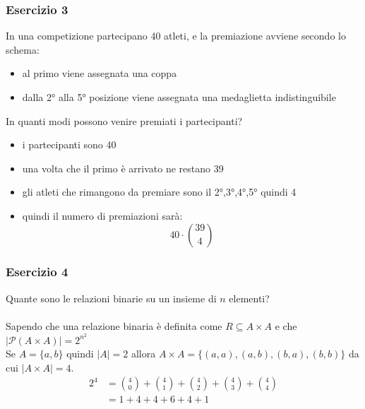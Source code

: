\documentclass[italian]{article}
\begin{document}
\subsubsection{Esercizio 3}
In una competizione partecipano 40 atleti, e la premiazione avviene secondo lo schema:
\begin{itemize}
	\item al primo viene assegnata una coppa
	\item dalla 2° alla 5° posizione viene assegnata una medaglietta indistinguibile
\end{itemize}
In quanti modi possono venire premiati i partecipanti?
\begin{itemize}
	\item i partecipanti sono 40
	\item una volta che il primo è arrivato ne restano 39
	\item gli atleti che rimangono da premiare sono il 2°,3°,4°,5° quindi 4
	\item quindi il numero di premiazioni sarà:
	\[ 40\cdot \binom{39}{4} \]
\end{itemize}
\subsubsection{Esercizio 4}
Quante sono le relazioni binarie su un insieme di $n$ elementi?\\\\
Sapendo che una relazione binaria è definita come $R \subseteq A \times A$ e che $|\mathcal{P}(A \times A)| = 2^{n^2}$\\
Se $A=\{ a,b \}$ quindi $|A| = 2$ allora $A\times A = \{(a,a),(a,b),(b,a),(b,b)\}$ da cui $|A \times A| = 4$.
\[
	\begin{split}
		2^4 &= \binom{4}{0} + \binom{4}{1} + \binom{4}{2} + \binom{4}{3} + \binom{4}{4}\\
		&= 1 + 4 + 4 + 6 + 4 + 1
	\end{split}
\]
\end{document}
